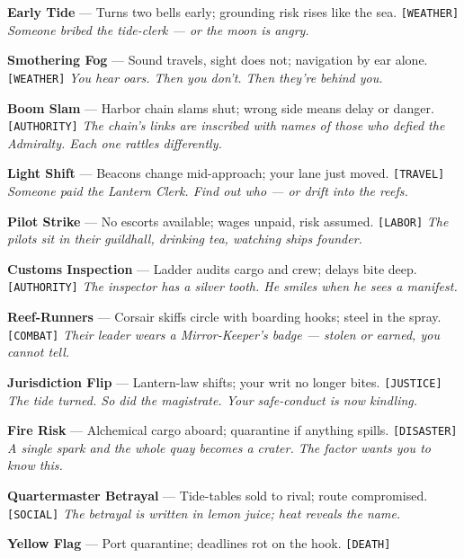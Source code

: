 \begin{enumerate}[label={[\Alph*]}]
\setcounter{enumi}{1}
\item \textbf{Early Tide} --- Turns two bells early; grounding risk rises like the sea. \texttt{[WEATHER]}
  \hfill \textit{Someone bribed the tide-clerk --- or the moon is angry.}
\item \textbf{Smothering Fog} --- Sound travels, sight does not; navigation by ear alone. \texttt{[WEATHER]}
  \hfill \textit{You hear oars. Then you don't. Then they're behind you.}
\item \textbf{Boom Slam} --- Harbor chain slams shut; wrong side means delay or danger. \texttt{[AUTHORITY]}
  \hfill \textit{The chain's links are inscribed with names of those who defied the Admiralty. Each one rattles differently.}
\item \textbf{Light Shift} --- Beacons change mid-approach; your lane just moved. \texttt{[TRAVEL]}
  \hfill \textit{Someone paid the Lantern Clerk. Find out who --- or drift into the reefs.}
\item \textbf{Pilot Strike} --- No escorts available; wages unpaid, risk assumed. \texttt{[LABOR]}
  \hfill \textit{The pilots sit in their guildhall, drinking tea, watching ships founder.}
\item \textbf{Customs Inspection} --- Ladder audits cargo and crew; delays bite deep. \texttt{[AUTHORITY]}
  \hfill \textit{The inspector has a silver tooth. He smiles when he sees a manifest.}
\item \textbf{Reef-Runners} --- Corsair skiffs circle with boarding hooks; steel in the spray. \texttt{[COMBAT]}
  \hfill \textit{Their leader wears a Mirror-Keeper's badge --- stolen or earned, you cannot tell.}
\item \textbf{Jurisdiction Flip} --- Lantern-law shifts; your writ no longer bites. \texttt{[JUSTICE]}
  \hfill \textit{The tide turned. So did the magistrate. Your safe-conduct is now kindling.}
\item \textbf{Fire Risk} --- Alchemical cargo aboard; quarantine if anything spills. \texttt{[DISASTER]}
  \hfill \textit{A single spark and the whole quay becomes a crater. The factor wants you to know this.}
\item \textbf{Quartermaster Betrayal} --- Tide-tables sold to rival; route compromised. \texttt{[SOCIAL]}
  \hfill \textit{The betrayal is written in lemon juice; heat reveals the name.}
\item \textbf{Yellow Flag} --- Port quarantine; deadlines rot on the hook. \texttt{[DEATH]}

\end{enumerate}
